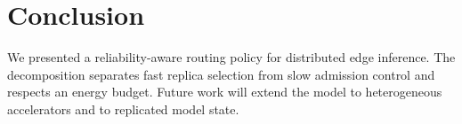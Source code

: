 \documentclass[conference]{IEEEtran}
\begin{document}
\section{Conclusion}
\label{sec:conclusion}
We presented a reliability-aware routing policy for distributed edge inference.
The decomposition separates fast replica selection from slow admission control and respects an energy budget.
Future work will extend the model to heterogeneous accelerators and to replicated model state.
\end{document}
